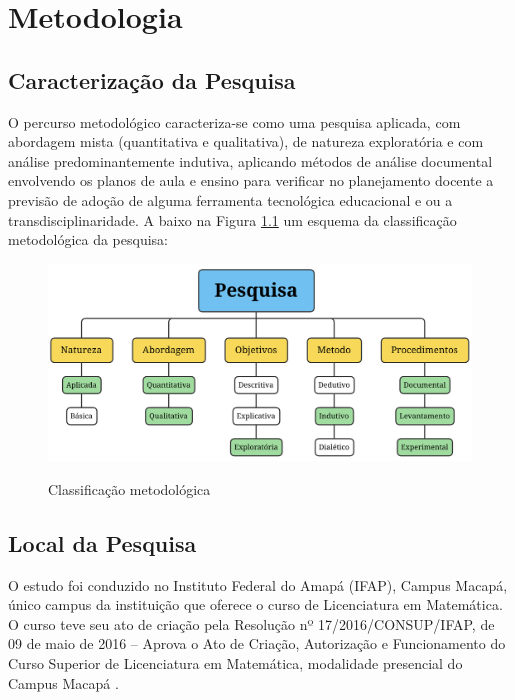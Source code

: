 

\chapter{Metodologia}
\label{metodologia}




\section{Caracterização da Pesquisa}

O percurso metodológico caracteriza-se como uma pesquisa aplicada, com abordagem mista (quantitativa e qualitativa), de natureza exploratória e com análise predominantemente indutiva, aplicando métodos de análise documental envolvendo os planos de aula e ensino para verificar no planejamento docente a previsão de adoção de alguma ferramenta tecnológica educacional e ou a transdisciplinaridade. A baixo na Figura \ref{fig:classificacao_metodologica} um esquema da classificação metodológica da pesquisa:

\begin{figure}[h!]
    \caption{Classificação metodológica}
    \centering
    \includegraphics[scale=0.5]{figuras/metodologia.png}
    \label{fig:classificacao_metodologica}
\end{figure}







\section{Local da Pesquisa}
\label{local_pesquisado}

O estudo foi conduzido no Instituto Federal do Amapá (IFAP), Campus Macapá, único campus da instituição que oferece o curso de Licenciatura em Matemática. O curso teve seu ato de criação pela Resolução nº 17/2016/CONSUP/IFAP, de 09 de maio de 2016 – Aprova o Ato de Criação, Autorização e Funcionamento do Curso Superior de Licenciatura em Matemática, modalidade presencial do Campus Macapá \cite{ifap2022}.

